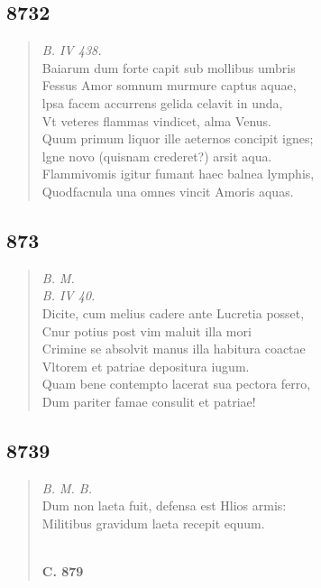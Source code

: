 \documentclass[11pt, a4paper]{report}
\begin{document}
            \subsection*{8732}
      \begin{verse}
      \textit{B. IV 438.} \\ Baiarum dum forte capit sub mollibus umbris \\ Fessus Amor somnum murmure captus aquae, \\ lpsa facem accurrens gelida celavit in unda, \\ Vt veteres flammas vindicet, alma Venus. \\ Quum primum liquor ille aeternos concipit ignes; \\ lgne novo (quisnam crederet?) arsit aqua. \\ Flammivomis igitur fumant haec balnea lymphis, \\ Quodfacnula una omnes vincit Amoris aquas. \\ 
      \end{verse}
  
            \subsection*{873}
      \begin{verse}
      \textit{B. M.} \\ \textit{B. IV 40.} \\ Dicite, cum melius cadere ante Lucretia posset, \\ Cnur potius post vim maluit illa mori \\ Crimine se absolvit manus illa habitura coactae \\ Vltorem et patriae depositura iugum. \\ Quam bene contempto lacerat sua pectora ferro, \\ Dum pariter famae consulit et patriae! \\ 
      \end{verse}
  
            \subsection*{8739}
      \begin{verse}
      \textit{B. M. B.} \\ Dum non laeta fuit, defensa est Hlios armis: \\ Militibus gravidum laeta recepit equum. \\ 
        ﻿\pagebreak 
    \begin{center} \textbf{C. 879} \end{center} \marginpar{[320]} 
      \end{verse}
  
\end{document}
